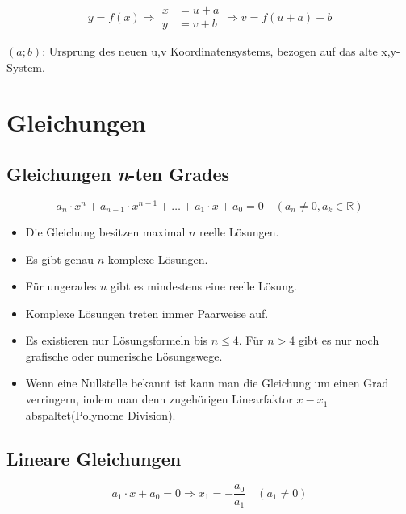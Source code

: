 
\begin{shaded}
 \begin{equation}
    y=f(x)\Rightarrow\left.\begin{aligned}
                            x&=u+a\\
			    y&=v+b
                           \end{aligned}\right.\Rightarrow v=f(u+a)-b
 \end{equation}
\end{shaded}
$(a;b)$: Ursprung des neuen u,v Koordinatensystems, bezogen auf das alte x,y-System. 

\section{Gleichungen}
\subsection{Gleichungen \emph{n}-ten Grades}
\begin{shaded}
 \begin{equation}
  a_n\cdot x^n+a_{n-1}\cdot x^{n-1}+\ldots+a_1\cdot x+a_0=0\quad (a_n\neq0,a_k\in\mathbb{R})
 \end{equation}

\end{shaded}
\begin{itemize}
 \item Die Gleichung besitzen maximal $n$ reelle Lösungen.
\item Es gibt genau $n$ komplexe Lösungen.
\item Für ungerades $n$ gibt es mindestens eine reelle Lösung.
\item Komplexe Lösungen treten immer Paarweise auf.
\item Es existieren nur Lösungsformeln bis $n\leq 4$. Für $n>4$ gibt es nur noch grafische oder numerische Lösungswege.
\item Wenn eine Nullstelle bekannt ist kann man die Gleichung um einen Grad verringern, indem man denn zugehörigen Linearfaktor $x -x_1$ abspaltet(Polynome Division).
\end{itemize}

\subsection{Lineare Gleichungen}
\begin{shaded}
 \begin{equation}
  a_1\cdot x+a_0=0 \Rightarrow x_1=-\frac{a_0}{a_1}\quad (a_1\neq 0)
 \end{equation}
\end{shaded}


